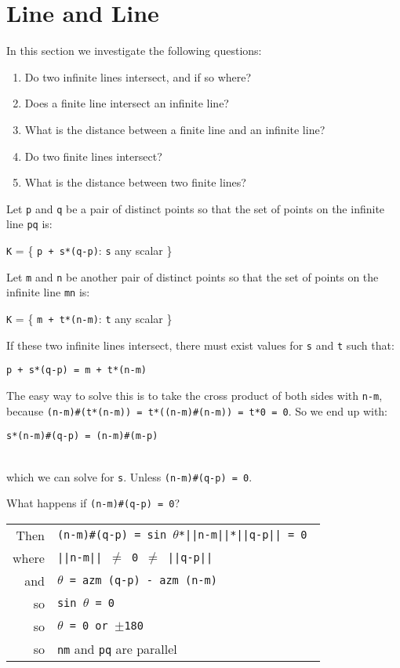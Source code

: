 \documentclass[12pt]{article}
\begin{document}
\newpage


\section{Line and Line}
In this section we investigate the following questions:
\begin{enumerate}
\item Do two infinite lines intersect, and if so where?
\item Does a finite line intersect an infinite line?
\item What is the distance between a finite line and an infinite line?
\item Do two finite lines intersect?
\item What is the distance between two finite lines?
\end{enumerate}

Let {\tt p} and {\tt q} be a pair of distinct points so that the set
of points on the infinite line {\tt pq} is: \\
\centerline{{\tt K} = \{ {\tt p + s*(q-p)}: {\tt s} any scalar \}} 

Let {\tt m} and {\tt n} be another pair of distinct points so that the set
of points on the infinite line {\tt mn} is: \\
\centerline{{\tt K} = \{ {\tt m + t*(n-m)}: {\tt t} any scalar \}} 

If these two infinite lines intersect, there must exist values for
{\tt s} and {\tt t} such that: \\
\centerline{{\tt p + s*(q-p) = m + t*(n-m)}}

The easy way to solve this is to take the cross product of both
sides with {\tt n-m}, because
{\tt (n-m)\#(t*(n-m)) = t*((n-m)\#(n-m)) = t*0 = 0}.
So we end up with: \\
\centerline{\tt s*(n-m)\#(q-p) = (n-m)\#(m-p)} \\
which we can solve for {\tt s}.  Unless {\tt (n-m)\#(q-p) = 0}.

What happens if {\tt (n-m)\#(q-p) = 0}? \\
\hspace*{0.3in}\begin{tabular}{r@{~~}l}
Then    & \tt (n-m)\#(q-p) = sin $\theta$*||n-m||*||q-p|| = 0 \\
where   & \tt ||n-m|| $\neq$ 0 $\neq$ ||q-p|| \\
and     & \tt $\theta$ = azm (q-p) - azm (n-m) \\
so      & \tt sin $\theta$ = 0 \\
so      & \tt $\theta$ = 0 or $\pm$180 \\
so      & {\tt nm} and {\tt pq} are parallel \\
        \end{tabular}
\end{document}
